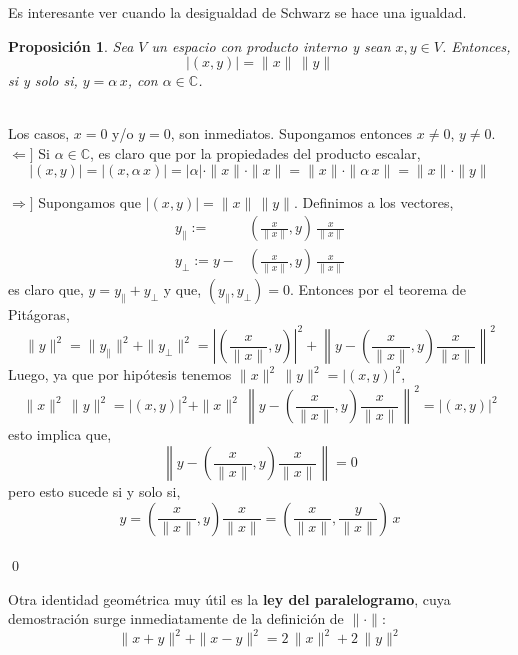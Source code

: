 \documentclass[12pt]{book}
\numberwithin{equation}{chapter}
\newtheorem{proposition}[theorem]{Proposici\'on}
\def\n{\noindent}
\def\C{\mathbb{C}}
\begin{document}
\vspace{5 mm}

\n Es interesante ver cuando la desigualdad de Schwarz se hace una igualdad.
\begin{proposition}\label{scheq}
Sea $V$ un espacio con producto interno y sean $x,y \in V$. Entonces,
$$ |(x,y)| = \|x\| \, \|y\| $$ 
si y solo si, $ y= \alpha \,x  $, con $\alpha \in \C$.
\end{proposition}
\n {\bf Demostraci\'on}\\
Los casos, $x=0$ y/o $y=0$, son inmediatos. Supongamos entonces $ x \neq 0 $, $ y \neq 0 $.\\

\n $ \Leftarrow ] $ Si $\alpha \in \C$, es claro que por la propiedades del producto escalar,
$$ |(x,y)|= |(x,\alpha\,x)|= |\alpha|\cdot \|x\|\cdot \|x\|= \|x\| \cdot \| \alpha \, x \|= \|x\| \cdot \|y\| $$

\n$ \Rightarrow ] $ Supongamos que $|(x,y)| = \|x\| \, \|y\|$. Definimos a los vectores,
\begin{align}
y_{\parallel} := &\left( \frac{x}{\|x\|},y \right)\, \frac{x}{\|x\|}\\
y_{\perp} := y - &\left( \frac{x}{\|x\|},y \right)\, \frac{x}{\|x\|}
\end{align}
es claro que, $y = y_{\parallel} + y_{\perp}$ y que, $ (y_{\parallel} , y_{\perp})=0 $. Entonces por el teorema de Pit\'agoras,
$$ \|y\|^{2}= \|y_{\parallel}\|^{2} + \|y_{\perp}\|^{2} = \left| \left( \frac{x}{\|x\|},y \right) \right|^{2} + \left\| y - \left( \frac{x}{\|x\|},y \right) \frac{x}{\|x\|} \right\|^{2} $$
Luego, ya que por hip\'otesis tenemos $ \|x\|^{2} \, \|y\|^{2}=|(x,y)|^{2} $,
$$ \|x\|^{2}\, \|y\|^{2} = |(x,y)|^{2} + \|x\|^{2}\, \left\| y - \left( \frac{x}{\|x\|},y \right) \frac{x}{\|x\|} \right\|^{2} = |(x,y)|^{2} $$
esto implica que, 
$$ \left\| y - \left( \frac{x}{\|x\|},y \right) \frac{x}{\|x\|} \right\|=0 $$ 
pero esto sucede si y solo si,
$$ y= \left( \frac{x}{\|x\|},y \right) \frac{x}{\|x\|} = \left( \frac{x}{\|x\|},\frac{y}{\|x\|} \right)\, x $$ \\ \qed

\vspace{5 mm}

Otra identidad geom\'etrica muy \'util es la {\bf ley del paralelogramo}, cuya demostraci\'on surge inmediatamente de la definici\'on de $\| \cdot \|$:
\begin{equation}
\|x+y\|^{2} + \|x-y\|^{2}= 2\, \|x\|^{2} + 2\, \|y\|^{2}
\end{equation}
\end{document}
